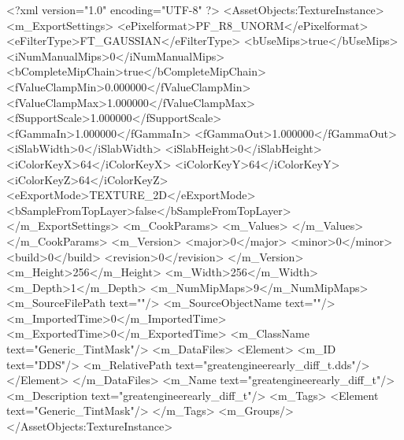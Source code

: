 <?xml version="1.0" encoding="UTF-8" ?>
<AssetObjects:TextureInstance>
<m_ExportSettings>
<ePixelformat>PF_R8_UNORM</ePixelformat>
<eFilterType>FT_GAUSSIAN</eFilterType>
<bUseMips>true</bUseMips>
<iNumManualMips>0</iNumManualMips>
<bCompleteMipChain>true</bCompleteMipChain>
<fValueClampMin>0.000000</fValueClampMin>
<fValueClampMax>1.000000</fValueClampMax>
<fSupportScale>1.000000</fSupportScale>
<fGammaIn>1.000000</fGammaIn>
<fGammaOut>1.000000</fGammaOut>
<iSlabWidth>0</iSlabWidth>
<iSlabHeight>0</iSlabHeight>
<iColorKeyX>64</iColorKeyX>
<iColorKeyY>64</iColorKeyY>
<iColorKeyZ>64</iColorKeyZ>
<eExportMode>TEXTURE_2D</eExportMode>
<bSampleFromTopLayer>false</bSampleFromTopLayer>
</m_ExportSettings>
<m_CookParams>
<m_Values>
</m_Values>
</m_CookParams>
<m_Version>
<major>0</major>
<minor>0</minor>
<build>0</build>
<revision>0</revision>
</m_Version>
<m_Height>256</m_Height>
<m_Width>256</m_Width>
<m_Depth>1</m_Depth>
<m_NumMipMaps>9</m_NumMipMaps>
<m_SourceFilePath text=""/>
<m_SourceObjectName text=""/>
<m_ImportedTime>0</m_ImportedTime>
<m_ExportedTime>0</m_ExportedTime>
<m_ClassName text="Generic_TintMask"/>
<m_DataFiles>
<Element>
<m_ID text="DDS"/>
<m_RelativePath text="greatengineerearly_diff_t.dds"/>
</Element>
</m_DataFiles>
<m_Name text="greatengineerearly_diff_t"/>
<m_Description text="greatengineerearly_diff_t"/>
<m_Tags>
<Element text="Generic_TintMask"/>
</m_Tags>
<m_Groups/>
</AssetObjects:TextureInstance>
